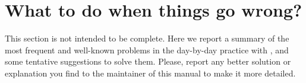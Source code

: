 
\thispagestyle{empty}
\section{What to do when things go wrong?}
\label{sec:troubleshoot}
%
This section is not intended to be complete. Here we report
a summary of the most frequent and well-known problems in the
day-by-day practice with \WANT, and some tentative suggestions to
solve them. Please, report any better solution or explanation you
find to the maintainer of this manual to make it more detailed.

